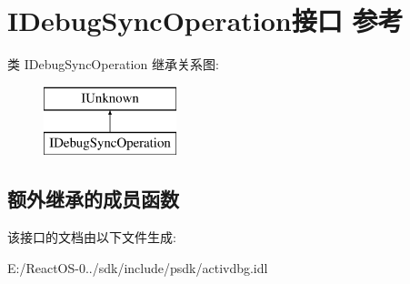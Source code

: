 \hypertarget{interface_i_debug_sync_operation}{}\section{I\+Debug\+Sync\+Operation接口 参考}
\label{interface_i_debug_sync_operation}
类 I\+Debug\+Sync\+Operation 继承关系图\+:\begin{figure}[H]
\begin{center}
\leavevmode
\includegraphics[height=2.000000cm]{interface_i_debug_sync_operation}
\end{center}
\end{figure}
\subsection*{额外继承的成员函数}


该接口的文档由以下文件生成\+:\begin{DoxyCompactItemize}
\item 
E\+:/\+React\+O\+S-\/0../sdk/include/psdk/activdbg.\+idl\end{DoxyCompactItemize}
